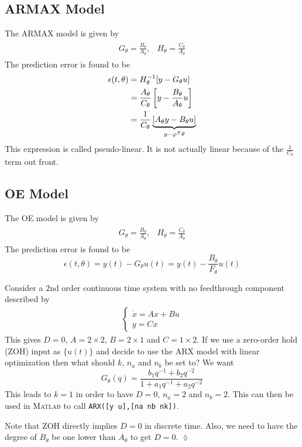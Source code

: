 \subsection{ARMAX Model}
The ARMAX model is given by
\begin{align*}
\begin{split}
G_\theta = \frac{B_\theta}{A_\theta},
\end{split}
\begin{split}
H_\theta = \frac{C_\theta}{A_\theta}
\end{split}
\end{align*}
The prediction error is found to be
\begin{align*}
\epsilon(t,\theta) &= H_\theta^{-1}[y-G_\theta u] \\
&= \frac{A_\theta}{C_\theta}\left[y-\frac{B_\theta}{A_\theta}u\right] \\
&= \frac{1}{C_\theta}\underbrace{\left[A_\theta y-B_\theta u\right]}_{y-\varphi^T\theta}
\end{align*}
This expression is called pseudo-linear. It is not actually linear because of the $\frac{1}{C_\theta}$ term out front.

\subsection{OE Model}
The OE model is given by
\begin{align*}
\begin{split}
G_\theta = \frac{B_\theta}{A_\theta},
\end{split}
\begin{split}
H_\theta = \frac{C_\theta}{A_\theta}
\end{split}
\end{align*}
The prediction error is found to be
$$\epsilon(t,\theta) = y(t)-G_\theta u(t) = y(t)-\frac{B_\theta}{F_\theta}u(t)$$

\begin{example}
Consider a $2$nd order continuous time system with no feedthrough component described by
\begin{align*}
\begin{cases} \dot{x}=Ax+Bu \\ y=Cx \end{cases}
\end{align*}
This gives $D=0$, $A=2\times 2$, $B=2\times 1$ and $C=1\times 2$. If we use a zero-order hold (ZOH) input as $\{u(t)\}$ and decide to use the ARX model with linear optimization then what should $k$, $n_a$ and $n_b$ be set to? We want
$$G_\theta(q) = \frac{b_1q^{-1}+b_2q^{-2}}{1+a_1q^{-1}+a_2q^{-2}}$$
This leads to $k=1$ in order to have $D=0$, $n_a=2$ and $n_b=2$. This can then be used in \textsc{Matlab} to call \texttt{ARX([y u],[na nb nk])}.

Note that ZOH directly implies $D=0$ in discrete time. Also, we need to have the degree of $B_\theta$ be one lower than $A_\theta$ to get $D=0$.
$\lozenge$
\end{example}

